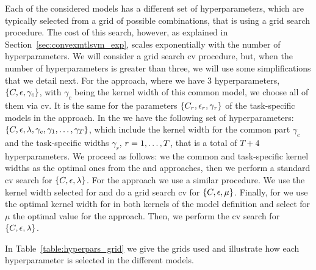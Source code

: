 Each of the considered models has a different set of hyperparameters, which are typically selected from a grid of possible combinations, that is using a grid search procedure. The cost of this search, however, as explained in Section~\ref{sec:convexmtlsvm_exp}, scales exponentially with the number of hyperparameters.
%
We will consider a grid search \acrshort{cv} procedure, but, when the number of hyperparameters is greater than three, we will use some simplifications that we detail next.
%
For the  approach, where we have \num{3} hyperparameters, $\left\{C, \epsilon, \gamma_c\right\}$, with $\gamma_c$ being the kernel width of this common model, we choose all of them via \acrshort{cv}. 
It is the same for the parameters $\left\{C_r, \epsilon_r, \gamma_r\right\}$ of the task-specific models in the  approach.
%
In the  we have the following set of hyperparameters: $\left\{C, \epsilon, \lambda, \gamma_c, \gamma_1, \ldots, \gamma_T\right\}$, which include the kernel width for the common part $\gamma_c$ and the task-specific widths $\gamma_r$, $r=1, \ldots, T$, that is a total of $T + 4$ hyperparameters. We proceed as follows: we the common and task-specific kernel widths as the optimal ones from the  and  approaches, then we perform a standard \acrshort{cv} search for $\left\{C, \epsilon, \lambda\right\}$.
%
For the  approach we use a similar procedure. We use the kernel width selected for  and do a grid search \acrshort{cv} for $\left\{C, \epsilon, \mu\right\}$.
%
Finally, for  we use the optimal kernel width for  in both kernels of the model definition and select for $\mu$ the optimal value for the  approach. Then, we perform the \acrshort{cv} search for $\left\{C, \epsilon, \lambda\right\}$.
%

In Table~\ref{table:hyperpars_grid} we give the grids used and illustrate how each hyperparameter is selected in the different models.

